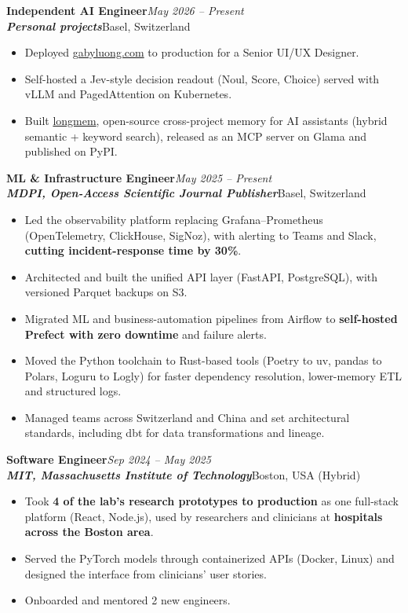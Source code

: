 \documentclass[11pt,a4paper]{article}
\newcommand{\role}[4]{%
  \needspace{5\baselineskip}%
  \noindent\textbf{#1}\hfill\textit{#2}\\
  \textbf{\textit{#3}}\hfill\textcolor{subtle}{#4}\par\vspace{2pt}%
}
\begin{document}
\role{Independent AI Engineer}{May 2026 -- Present}{Personal projects}{Basel, Switzerland}
\begin{itemize}
  \item Deployed \href{https://www.gabyluong.com}{gabyluong.com} to production for a Senior UI/UX Designer.
  \item Self-hosted a Jev-style decision readout (Noul, Score, Choice) served with vLLM and PagedAttention on Kubernetes.
  \item Built \href{https://github.com/marerem/longmem}{longmem}, open-source cross-project memory for AI assistants (hybrid semantic + keyword search), released as an MCP server on Glama and published on PyPI.
\end{itemize}

\role{ML \& Infrastructure Engineer}{May 2025 -- Present}{MDPI, Open-Access Scientific Journal Publisher}{Basel, Switzerland}
\begin{itemize}
  \item Led the observability platform replacing Grafana--Prometheus (OpenTelemetry, ClickHouse, SigNoz), with alerting to Teams and Slack, \textbf{cutting incident-response time by 30\%}.
  \item Architected and built the unified API layer (FastAPI, PostgreSQL), with versioned Parquet backups on S3.
  \item Migrated ML and business-automation pipelines from Airflow to \textbf{self-hosted Prefect with zero downtime} and failure alerts.
  \item Moved the Python toolchain to Rust-based tools (Poetry to uv, pandas to Polars, Loguru to Logly) for faster dependency resolution, lower-memory ETL and structured logs.
  \item Managed teams across Switzerland and China and set architectural standards, including dbt for data transformations and lineage.
\end{itemize}

\role{Software Engineer}{Sep 2024 -- May 2025}{MIT, Massachusetts Institute of Technology}{Boston, USA (Hybrid)}
\begin{itemize}
  \item Took \textbf{4 of the lab's research prototypes to production} as one full-stack platform (React, Node.js), used by researchers and clinicians at \textbf{hospitals across the Boston area}.
  \item Served the PyTorch models through containerized APIs (Docker, Linux) and designed the interface from clinicians' user stories.
  \item Onboarded and mentored 2 new engineers.
\end{itemize}
\end{document}
